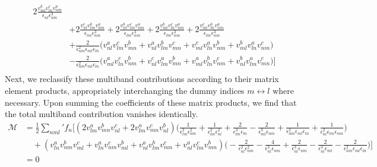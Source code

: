 \documentclass[twocolumn, prx, reprint, amsfonts, amsmath, amssymb, longbibliography, floatfix, aps]{revtex4-2}
\begin{document}
\begin{equation}
\begin{aligned}
		2\frac{v^b_{ml}v^c_{ln}v^a_{nm}}{\epsilon_{nl}\epsilon_{nm}^3}  \\
		&+ 2\frac{v^c_{nl}v^b_{lm}v^a_{mn}}{\epsilon_{lm}\epsilon_{nm}^3} + 2\frac{v^b_{nl}v^c_{lm}v^a_{mn}}{\epsilon_{lm}\epsilon_{nm}^3} +
		2\frac{v^b_{ml}v^c_{ln}v^a_{nm}}{\epsilon_{lm}\epsilon_{nm}^3} + 
		2\frac{v^c_{ml}v^b_{ln}v^a_{nm}}{\epsilon_{lm}\epsilon_{nm}^3} \\
		& + \frac{2}{\epsilon^2_{nm}\epsilon_{ml}\epsilon_{ln}} \Big(v^a_{nl}v^{c}_{lm}v^b_{mn} + v^a_{nl}v^{b}_{lm}v^c_{mn} + v^c_{ml}v^{a}_{ln}v^b_{nm} + v^b_{ml}v^{a}_{ln}v^c_{nm}\Big) \\
		& - \frac{2}{\epsilon^2_{nm}\epsilon_{ml}\epsilon_{ln}} \Big(v^a_{ml}v^{c}_{ln}v^b_{nm} + v^c_{nl}v^{a}_{lm}v^b_{mn} + v^a_{ml}v^{b}_{ln}v^c_{nm} + v^b_{nl}v^{a}_{lm}v^c_{mn}\Big)
		\Big]\\ 
	\end{aligned}
\end{equation}
Next, we reclassify these multiband contributions according to their matrix element products, appropriately interchanging the dummy indices $m \leftrightarrow l$ where necessary. Upon summing the coefficients of these matrix products, we find that the total multiband contribution vanishes identically.
\begin{equation}
	\begin{aligned}
		\mathcal{M}
		& = \frac{1}{2} {\textstyle \sum_{nml}'} f_n\Big[ (2v^a_{lm}v^b_{mn}v^c_{nl} + 2v^a_{lm}v^c_{mn}v^b_{nl}) \Big(\frac{1}{\epsilon_{lm}^2 \epsilon_{nm}^2} + \frac{1}{\epsilon_{lm}^2 \epsilon_{nl}^2} + \frac{2}{\epsilon_{lm}^3 \epsilon_{ln}} - \frac{2}{\epsilon_{ml}^3 \epsilon_{nm}}  + \frac{1}{\epsilon_{nm}^2 \epsilon_{ml} \epsilon_{ln}} + \frac{1}{\epsilon_{nl}^2 \epsilon_{lm} \epsilon_{mn}}\Big) \\
		& \quad + (v^a_{ln}v^b_{nm}v^c_{ml} + v^{a}_{ln}v^c_{nm}v^b_{ml} + v^a_{nl}v^b_{lm}v^c_{mn} + v^{a}_{nl}v^c_{lm}v^b_{mn})\Big(-\frac{2}{\epsilon_{nl}^2\epsilon_{nm}^2} - \frac{4}{\epsilon_{nl}^3 \epsilon_{nm}} + \frac{2}{\epsilon_{nl}^3\epsilon_{nm}} - \frac{2}{\epsilon_{nl}^3\epsilon_{ml}} - \frac{2}{\epsilon_{nm}^2\epsilon_{ml}\epsilon_{ln}}\Big)
		\Big] \\
		& = 0
	\end{aligned}
\end{equation}
\end{document}
